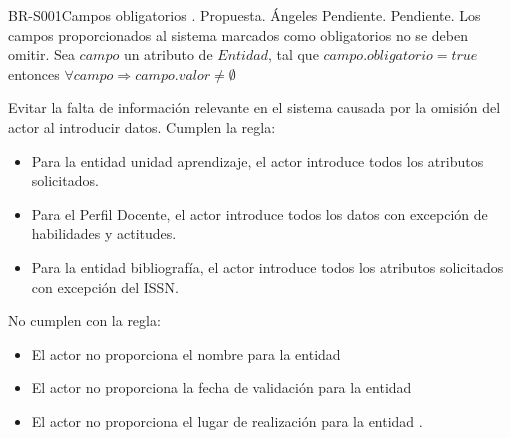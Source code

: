 \begin{BusinessRule}{BR-S001}{Campos obligatorios}
	{\bcIntegridad}    %
	{\btEnabler}     %
	{\blControlling}    %
	.
	\BRItem[Estado] Propuesta.
	 Ángeles
	 Pendiente.
	 Pendiente.
	\BRItem[Descripción] Los campos proporcionados al sistema marcados como obligatorios no se deben omitir.
	\BRItem[Sentencia] Sea $campo$ un atributo de $Entidad$, tal que $campo.obligatorio = true$ entonces
	$ \forall campo \Rightarrow campo.valor \neq \emptyset $
	
	\BRItem[Motivación] Evitar la falta de información relevante en el sistema causada por la omisión del actor al introducir datos.
	 Cumplen la regla:
	\begin{itemize}
		\item Para la entidad unidad aprendizaje, el actor introduce todos los atributos solicitados.
		\item Para el Perfil Docente, el actor introduce todos los datos con excepción de habilidades y actitudes.
		\item Para la entidad bibliografía, el actor introduce todos los atributos solicitados con excepción del ISSN.
	\end{itemize}
	 No cumplen con la regla:
	\begin{itemize}
		\item El actor no proporciona el nombre para la entidad
		\item El actor no proporciona la fecha de validación para la entidad 
		\item El actor no proporciona el lugar de realización para la entidad .
	\end{itemize}

\end{BusinessRule}


